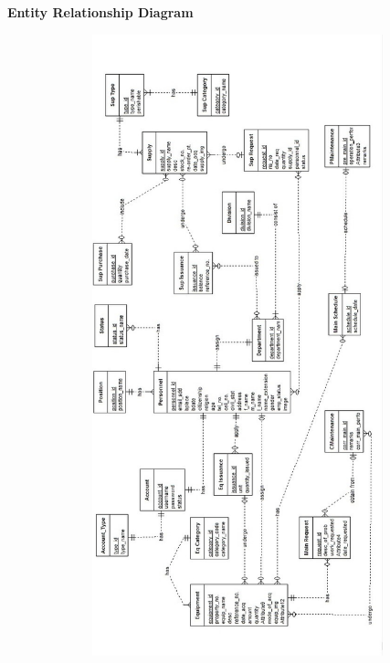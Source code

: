 
\begin{center} 
 \textbf{ }
 \textbf{Entity Relationship Diagram}
\end{center}
\begin{center}
\includegraphics[width=14cm,height=18cm]{image/E.jpg}
\end{center}
\vfill

\newpage

